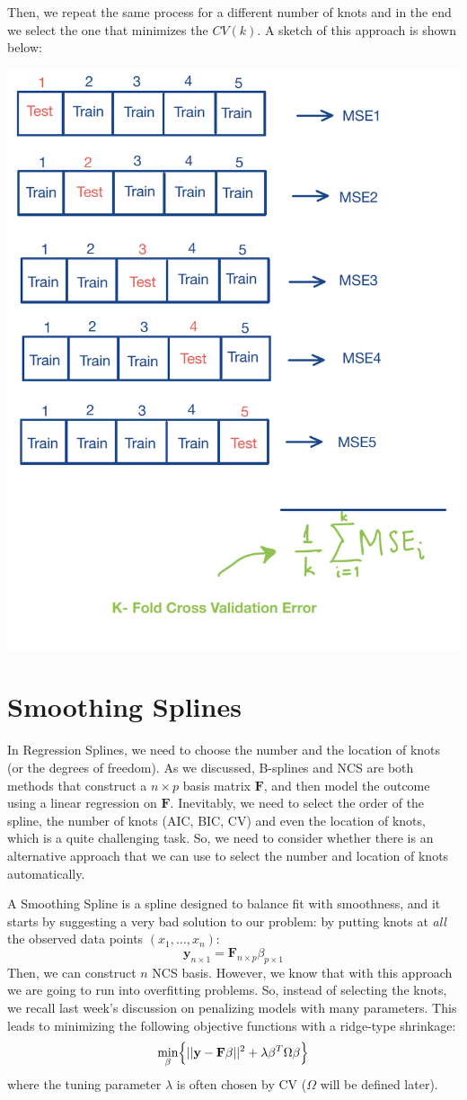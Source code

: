 \documentclass[
]{book}
\begin{document}
Then, we repeat the same process for a different number of knots and in the end we select the one that minimizes the \(CV(k)\). A sketch of this approach is shown below:

\begin{center}\includegraphics[width=0.6\linewidth]{images/week4/kfold} \end{center}

\section{Smoothing Splines}\label{smoothing-splines}

In Regression Splines, we need to choose the number and the location of knots (or the degrees of freedom). As we discussed, B-splines and NCS are both methods that construct a \(n \times p\) basis matrix \(\mathbf{F}\), and then model the outcome using a linear regression on \(\mathbf{F}\). Inevitably, we need to select the order of the spline, the number of knots (AIC, BIC, CV) and even the location of knots, which is a quite challenging task. So, we need to consider whether there is an alternative approach that we can use to select the number and location of knots automatically.

A Smoothing Spline is a spline designed to balance fit with smoothness, and it starts by suggesting a very bad solution to our problem: by putting knots at \textit{all} the observed data points \((x_1, \ldots, x_n)\):
\[\mathbf{y}_{n\times 1} = \mathbf{F}_{n\times p} \beta_{p\times 1}\]
Then, we can construct \(n\) NCS basis. However, we know that with this approach we are going to run into overfitting problems. So, instead of selecting the knots, we recall last week's discussion on penalizing models with many parameters. This leads to minimizing the following objective functions with a ridge-type shrinkage:
\[\min_{\beta} \Bigl\{ ||\mathbf{y}-\mathbf{F} \beta ||^2 + \lambda \beta^T \Omega \beta \Bigr\}\]
where the tuning parameter \(\lambda\) is often chosen by CV (\(\Omega\) will be defined later).
\end{document}
